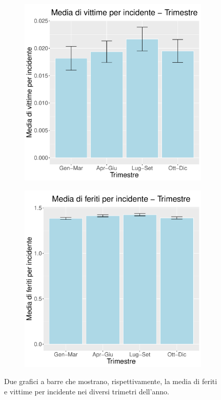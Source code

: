 \documentclass[12pt,a4paper,final,oneside]{article}			%
\begin{document}
        \begin{figure}[h]
            \begin{subfigure}{0.4\textwidth}
                \centering
                \includegraphics[scale=0.4]{../results/media_morti_per_incidente_trimestre.pdf}
            \end{subfigure}
            \hfill
            \begin{subfigure}{0.4\textwidth}
                \centering
                \includegraphics[scale=0.4]{../results/media_feriti_per_incidente_trimestre.pdf}
            \end{subfigure}
            \caption{Due grafici a barre che mostrano, rispettivamente, la media di feriti e vittime per incidente nei diversi trimetri dell’anno.}
            \label{Fig: vittime_incidenti_trimestre}
        \end{figure}
    
\end{document}
